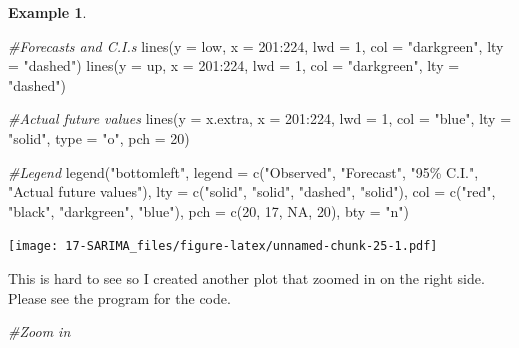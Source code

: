 \documentclass[
]{book}
\newenvironment{Shaded}{\begin{snugshade}}{\end{snugshade}}
\newcommand{\AttributeTok}[1]{\textcolor[rgb]{0.77,0.63,0.00}{#1}}
\newcommand{\CommentTok}[1]{\textcolor[rgb]{0.56,0.35,0.01}{\textit{#1}}}
\newcommand{\ConstantTok}[1]{\textcolor[rgb]{0.00,0.00,0.00}{#1}}
\newcommand{\DecValTok}[1]{\textcolor[rgb]{0.00,0.00,0.81}{#1}}
\newcommand{\FunctionTok}[1]{\textcolor[rgb]{0.00,0.00,0.00}{#1}}
\newcommand{\NormalTok}[1]{#1}
\newcommand{\SpecialCharTok}[1]{\textcolor[rgb]{0.00,0.00,0.00}{#1}}
\newcommand{\StringTok}[1]{\textcolor[rgb]{0.31,0.60,0.02}{#1}}
\theoremstyle{definition}
\theoremstyle{definition}
\newtheorem{example}{Example}[chapter]
\theoremstyle{definition}
\theoremstyle{definition}
\theoremstyle{remark}
\begin{document}
\begin{example}
\begin{Shaded}
\begin{Highlighting}[]
\CommentTok{\#Forecasts and C.I.s}
\FunctionTok{lines}\NormalTok{(}\AttributeTok{y =}\NormalTok{ low, }\AttributeTok{x =} \DecValTok{201}\SpecialCharTok{:}\DecValTok{224}\NormalTok{, }\AttributeTok{lwd =} \DecValTok{1}\NormalTok{, }\AttributeTok{col =} \StringTok{"darkgreen"}\NormalTok{, }
    \AttributeTok{lty =} \StringTok{"dashed"}\NormalTok{) }
\FunctionTok{lines}\NormalTok{(}\AttributeTok{y =}\NormalTok{ up, }\AttributeTok{x =} \DecValTok{201}\SpecialCharTok{:}\DecValTok{224}\NormalTok{, }\AttributeTok{lwd =} \DecValTok{1}\NormalTok{, }\AttributeTok{col =} \StringTok{"darkgreen"}\NormalTok{, }
    \AttributeTok{lty =} \StringTok{"dashed"}\NormalTok{) }


\CommentTok{\#Actual future values}
\FunctionTok{lines}\NormalTok{(}\AttributeTok{y =}\NormalTok{ x.extra, }\AttributeTok{x =} \DecValTok{201}\SpecialCharTok{:}\DecValTok{224}\NormalTok{, }\AttributeTok{lwd =} \DecValTok{1}\NormalTok{, }\AttributeTok{col =} \StringTok{"blue"}\NormalTok{, }
    \AttributeTok{lty =} \StringTok{"solid"}\NormalTok{, }\AttributeTok{type =} \StringTok{"o"}\NormalTok{, }\AttributeTok{pch =} \DecValTok{20}\NormalTok{) }

\CommentTok{\#Legend}
\FunctionTok{legend}\NormalTok{(}\StringTok{"bottomleft"}\NormalTok{, }\AttributeTok{legend =} \FunctionTok{c}\NormalTok{(}\StringTok{"Observed"}\NormalTok{, }\StringTok{"Forecast"}\NormalTok{, }
    \StringTok{"95\% C.I."}\NormalTok{, }\StringTok{"Actual future values"}\NormalTok{), }\AttributeTok{lty =} \FunctionTok{c}\NormalTok{(}\StringTok{"solid"}\NormalTok{, }
    \StringTok{"solid"}\NormalTok{, }\StringTok{"dashed"}\NormalTok{, }\StringTok{"solid"}\NormalTok{), }\AttributeTok{col =} \FunctionTok{c}\NormalTok{(}\StringTok{"red"}\NormalTok{, }\StringTok{"black"}\NormalTok{, }
    \StringTok{"darkgreen"}\NormalTok{, }\StringTok{"blue"}\NormalTok{), }\AttributeTok{pch =} \FunctionTok{c}\NormalTok{(}\DecValTok{20}\NormalTok{, }\DecValTok{17}\NormalTok{, }\ConstantTok{NA}\NormalTok{, }\DecValTok{20}\NormalTok{), }\AttributeTok{bty =} 
    \StringTok{"n"}\NormalTok{)}
\end{Highlighting}
\end{Shaded}

\texttt{[image: 17-SARIMA\_files/figure-latex/unnamed-chunk-25-1.pdf]}

This is hard to see so I created another plot that zoomed in on the right side. Please see the program for the code.

\begin{Shaded}
\begin{Highlighting}[]
\CommentTok{\#Zoom in}
   

\end{Highlighting}
\end{Shaded}
\end{example}
\end{document}
